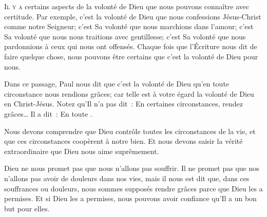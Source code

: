 \dvrule






\lettrine{I}{l y a} certains aspects de la volonté de Dieu
 que nous pouvons connaître avec certitude. Par exemple, c'est la volonté
 de Dieu que nous confessions Jésus-Christ comme notre Seigneur;
 c'est Sa volonté que nous marchions dans l'amour;
 c'est Sa volonté que nous nous traitions avec gentillesse;
 c'est Sa volonté que nous pardonnions à ceux qui nous ont offensés.
 Chaque fois que l'Écriture nous dit de faire quelque chose,
 nous pouvons être certains que c'est la volonté de Dieu pour nous.

Dans ce passage, Paul nous dit que c'est la volonté de Dieu \og qu'en toute
 circonstance nous rendions grâces; car telle est à votre égard la volonté
 de Dieu en Christ-Jésus. \fg{}
 Notez qu'Il n'a pas dit~: 
 \og En certaines circonstances, rendez grâces\dots{} \fg{}
 Il a dit~:  \og En toute \fg{}.


Nous devons comprendre que Dieu contrôle toutes les circonstances de la vie,
 et que ces circonstances coopèrent à notre bien.
 Et nous devons saisir la vérité extraordinaire que Dieu nous aime suprêmement.

Dieu ne nous promet pas que nous n'allons pas souffrir.
 Il ne promet pas que nos n'allons pas avoir de douleurs dans nos vies,
 mais il nous est dit que, dans ces souffrances ou douleurs,
 nous sommes supposés rendre grâces \ocadr parce que Dieu les a permises.
 Et si Dieu les a permises, nous pouvons avoir confiance qu'Il a un bon but
 pour elles.

\dvrule



